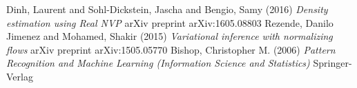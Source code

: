 \documentclass[12pt]{article}
\begin{document}
\begin{thebibliography}{9}
 Dinh, Laurent and Sohl-Dickstein, Jascha and Bengio, Samy (2016)  \emph{Density estimation using Real NVP} arXiv preprint arXiv:1605.08803 
 Rezende, Danilo Jimenez and Mohamed, Shakir (2015) \emph{Variational inference with normalizing flows} arXiv preprint arXiv:1505.05770
 Bishop, Christopher M. (2006) \emph{Pattern Recognition and Machine Learning (Information Science and Statistics)} Springer-Verlag
\end{thebibliography}
\end{document}
